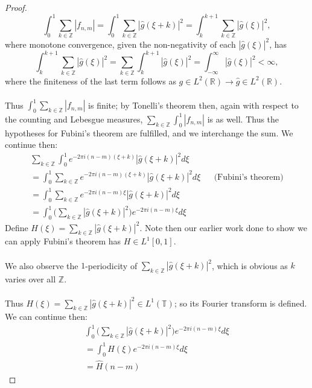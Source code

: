 \documentclass[12pt]{article}
\newenvironment{ex}[2][Exercise]{\begin{trivlist}
\item[\hskip \labelsep {\bfseries #1}\hskip \labelsep {\bfseries #2.}]}{\end{trivlist}}
\begin{document}
\begin{ex}{12}
\begin{proof}
        $$\int_0^1 \sum_{k \in \mathbb{Z}} |f_{n,m}| = \int_0^1 \sum_{k \in \mathbb{Z}} |\hat{g}(\xi + k)|^2 = \int_{k}^{k + 1} \sum_{k \in \mathbb{Z}} |\hat{g}(\xi)|^2,$$
        where monotone convergence, given the non-negativity of each $|\hat{g}(\xi)|^2$, has 
        $$\int_{k}^{k + 1}\sum_{k \in \mathbb{Z}} |\hat{g}(\xi)|^2 = \sum_{k \in \mathbb{Z}} \int_{k}^{k + 1} |\hat{g}(\xi)|^2 = \int_{-\infty}^\infty |\hat{g}(\xi)|^2 < \infty,$$
        where the finiteness of the last term follows as $g \in L^2(\mathbb{R}) \rightarrow \hat{g} \in L^2(\mathbb{R})$. \\ \\
        Thus $\int_0^1 \sum_{k \in \mathbb{Z}} |f_{n,m}|$ is finite; by Tonelli's theorem then, again with respect to the counting and Lebesgue measures, $\sum_{k \in \mathbb{Z}} \int_0^1 |f_{n,m}|$ is as well. Thus the hypotheses for Fubini's theorem are fulfilled, and we interchange the sum. We continue then:
        \begin{align*}
            \sum_{k \in \mathbb{Z}} \int_0^1 e^{{-2\pi i}(n - m)(\xi + k)}|\hat{g}(\xi + k)|^2 d\xi \\
            = \int_0^1 \sum_{k \in \mathbb{Z}} e^{{-2\pi i}(n - m)(\xi + k)}|\hat{g}(\xi + k)|^2 d\xi && \text{(Fubini's theorem)} \\
            = \int_0^1 \sum_{k \in \mathbb{Z}} e^{-2\pi i(n - m)\xi}|\hat{g}(\xi + k)|^2 d\xi \\
            = \int_0^1 \Big ( \sum_{k \in \mathbb{Z}} |\hat{g}(\xi + k)|^2 \Big)e^{-2\pi i(n - m)\xi} d\xi
        \end{align*}
        Define $H(\xi) = \sum_{k \in \mathbb{Z}} |\hat{g}(\xi + k)|^2$. Note then our earlier work done to show we can apply Fubini's theorem has $H \in L^1[0,1]$. \\ \\
        We also observe the $1$-periodicity of $\sum_{k \in \mathbb{Z}} |\hat{g}(\xi + k)|^2$, which is obvious as $k$ varies over all $\mathbb{Z}$. \\ \\
        Thus $H(\xi) = \sum_{k \in \mathbb{Z}} |\hat{g}(\xi + k)|^2 \in L^1(\mathbb{T})$; so its Fourier transform is defined. We can continue then:
        \begin{align*}
            \int_0^1 \Big ( \sum_{k \in \mathbb{Z}} |\hat{g}(\xi + k)|^2 \Big)e^{-2\pi i(n - m)\xi} d\xi \\
            = \int_0^1 H(\xi)e^{-2\pi i(n - m)\xi}d\xi \\
            = \hat{H}(n -m)

\end{align*}
\end{proof}
\end{ex}
\end{document}

